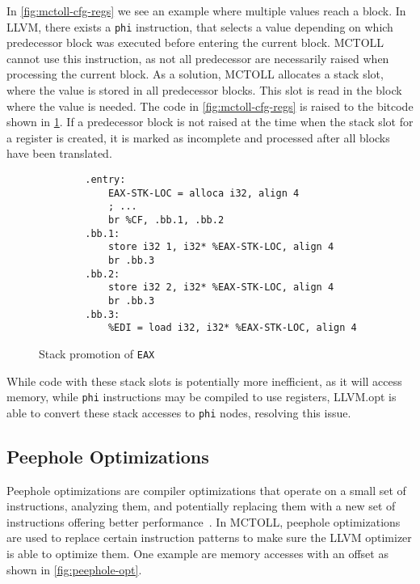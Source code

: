 In \cref{fig:mctoll-cfg-regs} we see an example where multiple values reach a block.
In LLVM, there exists a \texttt{phi} instruction, that selects a value depending on which predecessor block was executed before entering the current block.
MCTOLL cannot use this instruction, as not all predecessor are necessarily raised when processing the current block.
As a solution, MCTOLL allocates a stack slot, where the value is stored in all predecessor blocks.
This slot is read in the block where the value is needed.
The code in \cref{fig:mctoll-cfg-regs} is raised to the bitcode shown in \cref{fig:mctoll-stack-promotion}.
If a predecessor block is not raised at the time when the stack slot for a register is created, it is marked as incomplete and processed after all blocks have been translated.

\begin{figure}[htpb]
    \centering
    \begin{lstlisting}
        .entry:
            EAX-STK-LOC = alloca i32, align 4
            ; ...
            br %CF, .bb.1, .bb.2
        .bb.1:
            store i32 1, i32* %EAX-STK-LOC, align 4
            br .bb.3
        .bb.2:
            store i32 2, i32* %EAX-STK-LOC, align 4
            br .bb.3
        .bb.3:
            %EDI = load i32, i32* %EAX-STK-LOC, align 4
    \end{lstlisting}
    \caption{Stack promotion of \texttt{EAX}}
    \label{fig:mctoll-stack-promotion}
\end{figure}

While code with these stack slots is potentially more inefficient, as it will access memory, while \texttt{phi} instructions may be compiled to use registers, LLVM.opt is able to convert these stack accesses to \texttt{phi} nodes, resolving this issue.

\subsection{Peephole Optimizations}\label{subsec:peephole-optimizations}

Peephole optimizations are compiler optimizations that operate on a small set of instructions, analyzing them, and potentially replacing them with a new set of instructions offering better performance~\parencite{10.1145/364995.365000}.
In MCTOLL, peephole optimizations are used to replace certain instruction patterns to make sure the LLVM optimizer is able to optimize them.
One example are memory accesses with an offset as shown in \cref{fig:peephole-opt}.

